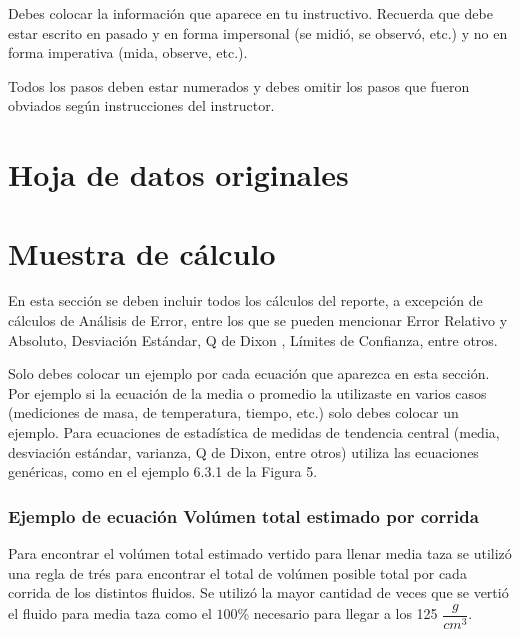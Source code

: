 \documentclass[12pt,letterpaper]{article}
\begin{document}
Debes colocar la información que aparece en tu instructivo. Recuerda que debe estar escrito en pasado y en forma impersonal (se midió, se observó, etc.) y no en forma imperativa (mida, observe, etc.).\

Todos los pasos deben estar numerados y debes omitir los pasos que fueron obviados según
instrucciones del instructor.



\section{Hoja de datos originales}


% 

%



\section{Muestra de cálculo}

En esta sección se deben incluir todos los cálculos del reporte, a excepción de cálculos de Análisis de Error, entre los que se pueden mencionar Error Relativo y Absoluto, Desviación Estándar, Q de Dixon , Límites de Confianza, entre otros.\

Solo debes colocar un ejemplo por cada ecuación que aparezca en esta sección. Por ejemplo si la ecuación de la media o promedio la utilizaste en varios casos (mediciones de masa, de temperatura, tiempo, etc.) solo debes colocar un ejemplo. Para ecuaciones de estadística de medidas de tendencia central (media, desviación estándar, varianza, Q de Dixon, entre otros) utiliza las ecuaciones genéricas, como en el ejemplo 6.3.1 de la Figura 5.




\subsubsection{Ejemplo de ecuación Volúmen total estimado por corrida}


Para encontrar el volúmen total estimado vertido para llenar media taza se utilizó una regla de trés para encontrar el total de volúmen posible total por cada corrida de los distintos fluidos. Se utilizó la mayor cantidad de veces que se vertió el fluido para media taza como el $100 \%$ necesario para llegar a los 125 $\dfrac{g}{cm^{3}}$.
\end{document}
